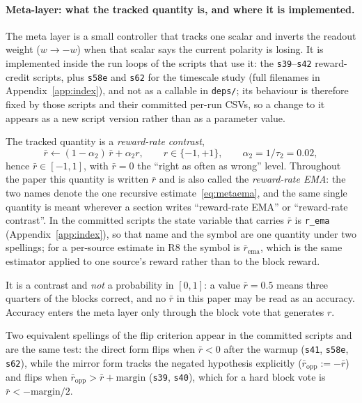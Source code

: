 \documentclass[preprint,12pt]{elsarticle}
\begin{document}
\paragraph{Meta-layer: what the tracked quantity is, and where it is
implemented.} The meta layer is a small controller that tracks one scalar and
inverts the readout weight ($w\to-w$) when that scalar says the current
polarity is losing. It is implemented inside the run loops of the scripts that
use it: the \texttt{s39}--\texttt{s42} reward-credit scripts, plus
\texttt{s58e} and \texttt{s62} for the timescale study (full filenames in
Appendix~\ref{app:index}), and not as a callable in
\texttt{deps/}; its behaviour is therefore fixed by those scripts and their
committed per-run CSVs, so a change to it appears as a new script version
rather than as a parameter value.

The tracked quantity is a \emph{reward-rate
contrast},
\begin{equation}
\label{eq:metaema}
\bar r \leftarrow (1-\alpha_2)\,\bar r+\alpha_2 r,
\qquad r\in\{-1,+1\},\qquad \alpha_2=1/\tau_2=0.02 ,
\end{equation}
hence $\bar r\in[-1,1]$, with $\bar r=0$ the ``right as often as wrong''
level. Throughout the paper this quantity is written $\bar r$ and is also
called the \emph{reward-rate EMA}: the two names denote the one recursive
estimate~\eqref{eq:metaema}, and the same single quantity is meant wherever a
section writes ``reward-rate EMA'' or ``reward-rate contrast''. In the
committed scripts the state variable that carries $\bar r$ is
\texttt{r\_ema} (Appendix~\ref{app:index}), so that name and the symbol are one
quantity under two spellings; for a
per-source estimate in R8 the symbol is $\bar r_{\mathrm{ema}}$, which is the
same estimator applied to one source's reward rather than to the block reward.

It is a contrast and
\emph{not} a probability in $[0,1]$: a value
$\bar r=0.5$ means three quarters of the blocks correct, and no $\bar r$ in
this paper may be read as an accuracy. Accuracy enters the meta layer only
through the block vote that generates $r$.

Two equivalent spellings of the
flip criterion appear in the committed scripts and are the same test: the
direct form flips when $\bar r<0$ after the warmup (\texttt{s41},
\texttt{s58e}, \texttt{s62}), while the mirror form tracks the negated
hypothesis explicitly ($\bar r_{\mathrm{opp}}:=-\bar r$) and flips when
$\bar r_{\mathrm{opp}}>\bar r+\text{margin}$ (\texttt{s39}, \texttt{s40}),
which for a hard block vote is $\bar r<-\text{margin}/2$.
\end{document}

